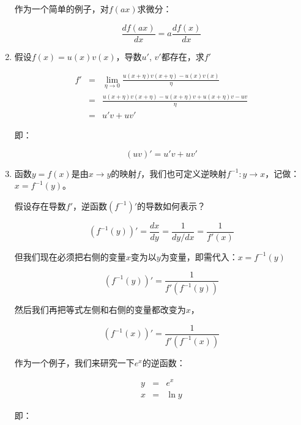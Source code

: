 \begin{enumerate}
作为一个简单的例子，对$f(ax)$求微分：

\begin{equation}
\frac{d f(ax)}{d x} = a \frac{d f(x)}{ d x} 
\end{equation}

\item

假设$f(x) = u(x) v(x)$，导数$u'$, $v'$都存在，求$f'$

\begin{eqnarray*}
f' & = & \lim\limits_{\eta \to 0} \frac{ u(x+\eta) v (x+ \eta) - u(x) v(x) }{ \eta } \\
{} & = & \frac{  u(x+\eta) v (x+ \eta) - u(x+\eta) v + u(x+\eta) v - u v  }{\eta} \\
{} & = & u'v + u v'
\end{eqnarray*}

即：

\begin{equation}
( u v)' = u' v + u v'
\end{equation}

\item

函数$y = f(x)$是由$x \to y$的映射$f$，我们也可定义逆映射$f^{-1}: y \to x$，记做：$x = f^{-1}(y)$。

假设存在导数$f'$，逆函数$(f^{-1})'$的导数如何表示？

\begin{equation*}
\left(  f^{-1} (y) \right)' = \frac{dx}{dy} = \frac{1}{dy/dx} = \frac{1}{ f'(x) }
\end{equation*}

但我们现在必须把右侧的变量$x$变为以$y$为变量，即需代入：$x = f^{-1} (y)$

\begin{equation*}
\left(  f^{-1} (y) \right)' = \frac{1}{ f'( f^{-1} (y)) }
\end{equation*}

然后我们再把等式左侧和右侧的变量都改变为$x$，

\begin{equation}
\left(  f^{-1} (x) \right)' = \frac{1}{ f'( f^{-1} (x)) }
\end{equation}

作为一个例子，我们来研究一下$e^x$的逆函数：

\begin{eqnarray*}
y &=& e^x \\
x &=& \ln y
\end{eqnarray*}

即：


\end{enumerate}
